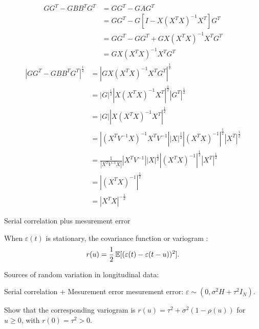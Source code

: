 \documentclass[UTF8,a4paper,10pt]{article}
\begin{document}
  \begin{solution}\,\\

    \begin{equation*}
      \begin{aligned}
        GG^{T}-GBB^{T}G^{T}
        &= GG^{T}-GAG^{T}\\
        &= GG^{T}-G[I-X(X^{T}X)^{-1}X^{T}]G^{T}\\
        &= GG^{T}-GG^{T} + GX(X^{T}X)^{-1}X^{T}G^{T}\\
        &= GX(X^{T}X)^{-1}X^{T}G^{T}
      \end{aligned}
    \end{equation*}
    \begin{equation*}
      \begin{aligned}
        |GG^{T}-GBB^{T}G^{T}|^{\frac{1}{2}} 
        &= |GX(X^{T}X)^{-1}X^{T}G^{T}|^{\frac{1}{2}} \\
        &= |G|^{\frac{1}{2}} |X(X^{T}X)^{-1}X^{T}|^{\frac{1}{2}} |G^{T}|^{\frac{1}{2}} \\
        &= |G||X(X^{T}X)^{-1}X^{T}|^{\frac{1}{2}} \\
        &= |(X^{T}V^{-1}X)^{-1}X^{T}V^{-1}|  |X|^{\frac{1}{2}}|(X^{T}X)^{-1}|^{\frac{1}{2}}|X^{T}|^{\frac{1}{2}}\\
        &=\frac{1}{|X^{T}V^{-1}X|}|X^{T}V^{-1}||X|^{\frac{1}{2}}|(X^{T}X)^{-1}|^{\frac{1}{2}}|X^{T}|^{\frac{1}{2}}\\
        &=|(X^{T}X)^{-1}|^{\frac{1}{2}}\\
        &=|X^{T}X|^{-\frac{1}{2}}
      \end{aligned}
    \end{equation*}
  \end{solution}
    

          
  \begin{Problem}[]{Serial correlation plus mesurement error}

    When \(\varepsilon(t) \) is stationary, the covariance function or variogram :
    \begin{equation*}
      \begin{aligned}
        r(u) = \frac{1}{2}\operatorname{\mathbb{E}}[(\varepsilon(t)-\varepsilon(t-u))^2].
      \end{aligned}
    \end{equation*}

Sources of random variation in longitudinal data:

    Serial correlation + Mesurement error mesurement error: \(\varepsilon \sim (0,\sigma^2 H+\tau^2I_N)\).

    Show that the corresponding variogram is \(r(u) = \tau^2+\sigma^2(1-\rho(u))\) for \(u\geq 0\), with \(r(0) = \tau^2>0\).

    
      \end{Problem} 
\end{document}
